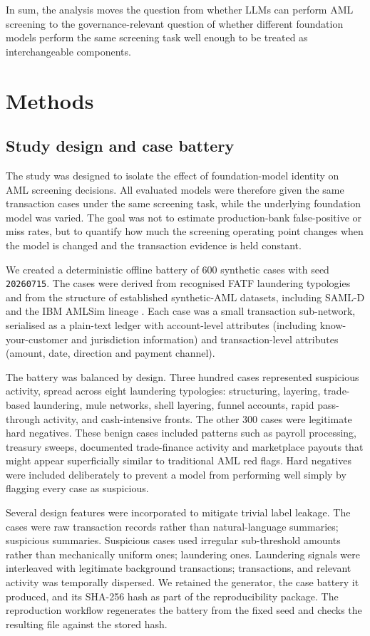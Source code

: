 \documentclass[pdflatex,sn-basic,Numbered]{sn-jnl}
\newcommand{\HLtext}[1]{\texthl{#1}}
\newcommand{\HLdel}[1]{\textcolor{HLink}{\sout{#1}}}
\renewcommand{\HLtext}[1]{#1}\renewcommand{\HLdel}[1]{#1}%
\begin{document}
In sum, the analysis moves the question from whether LLMs can perform AML screening to the governance-relevant question of whether different foundation models perform the same screening task well enough to be treated as interchangeable components.

\section{Methods}\label{sec:methods}

\subsection{Study design and case battery}

The study was designed to isolate the effect of foundation-model identity on AML screening decisions. All evaluated models were therefore given the same transaction cases under the same screening task, while the underlying foundation model was varied. The goal was not to estimate production-bank false-positive or miss rates, but to quantify how much the screening operating point changes when the model is changed and the transaction evidence is held constant.

We created a deterministic offline battery of 600 synthetic cases with seed \texttt{20260715}. The cases were derived from recognised FATF laundering typologies and from the structure of established synthetic-AML datasets, including SAML-D and the IBM AMLSim lineage \cite{samld,weber2018}. Each case was a small transaction sub-network, serialised as a plain-text ledger with account-level attributes (including know-your-customer and jurisdiction information) and transaction-level attributes (amount, date, direction and payment channel).

The battery was balanced by design. Three hundred cases represented suspicious activity, spread across eight laundering typologies: structuring, layering, trade-based laundering, mule networks, shell layering, funnel accounts, rapid pass-through activity, and cash-intensive fronts. The other 300 cases were legitimate hard negatives. These benign cases included patterns such as payroll processing, treasury sweeps, documented trade-finance activity and marketplace payouts that might appear superficially similar to traditional AML red flags. Hard negatives were included deliberately to prevent a model from performing well simply by flagging every case as suspicious.

Several design features were incorporated to mitigate trivial label leakage. The cases were raw transaction records rather than natural-language \HLdel{summaries; suspicious} \HLtext{summaries. Suspicious} cases used irregular sub-threshold amounts rather than mechanically uniform \HLdel{ones; laundering} \HLtext{ones. Laundering} signals were interleaved with legitimate background \HLdel{transactions;} \HLtext{transactions,} and relevant activity was temporally dispersed. We retained the generator, the case battery it produced, and its SHA-256 hash as part of the reproducibility package. The reproduction workflow regenerates the battery from the fixed seed and checks the resulting file against the stored hash.
\end{document}
